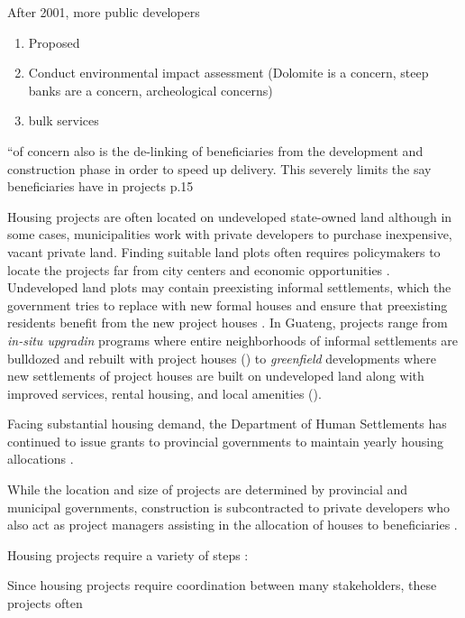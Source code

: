 \documentclass[12pt]{article}
\begin{document}
After 2001, more public developers



\begin{enumerate}
	\item Proposed 
	\item Conduct environmental impact assessment (Dolomite is a concern, steep banks are a concern, archeological concerns)
	\item bulk services

\end{enumerate}


“of concern also is the de-linking of beneficiaries from
the development and construction phase in order to speed up delivery. This severely
limits the say beneficiaries have in projects
p.15



Housing projects are often located on undeveloped state-owned land although in some cases, municipalities work with private developers to purchase inexpensive, vacant private land.  Finding suitable land plots often requires policymakers to locate the projects far from city centers and economic opportunities \citep{dhsreports}.  Undeveloped land plots may contain preexisting informal settlements, which the government tries to replace with new formal houses and ensure that preexisting residents benefit from the new project houses \citep{serihistory}.  In Guateng, projects range from \textit{in-situ upgradin} programs where entire neighborhoods of informal settlements are bulldozed and rebuilt with project houses (\cite{hofmeyr2008risk}) to \textit{greenfield} developments where new settlements of project houses are built on undeveloped land along with improved services, rental housing, and local amenities (\cite{greenfield}).

Facing substantial housing demand, the Department of Human Settlements has continued to issue grants to provincial governments to maintain yearly housing allocations \citep{dhsreports}. 



While the location and size of projects are determined by provincial and municipal governments, construction is subcontracted to private developers who also act as project managers assisting in the allocation of houses to beneficiaries \citep{seriq}.

Housing projects require a variety of steps : 


Since housing projects require coordination between many stakeholders, these pro\-jects often 
\end{document}
